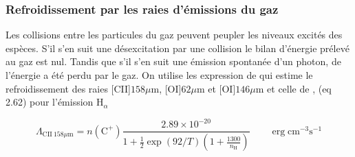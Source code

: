 






\subsubsection{Refroidissement par les raies d'émissions du gaz}

Les collisions entre les particules du gaz peuvent peupler les niveaux excités des espèces. S'il s'en suit une désexcitation par une collision le bilan d'énergie prélevé au gaz est nul. Tandis que s'il s'en suit une émission spontanée d'un photon, de l'énergie a été perdu par le gaz. On utilise les expression de \cite{Rollig2005} qui estime le refroidissement des raies [CII]$158 \mu \mathrm{m}$, [OI]$62 \mu \mathrm{m}$ et [OI]$146 \mu \mathrm{m}$ et celle de \cite{tielens2005}, (eq 2.62) pour l'émission $\mathrm{H}_\alpha$

\begin{equation}
    \Lambda_{\mathrm{CII}\ 158   \mu \mathrm{m}}= n(\mathrm{C}^+) \frac{2.89 \times 10^{-20}}{1+\frac{1}{2} \exp (92 / T)\left(1+\frac{1300}{n_\mathrm{H}}\right)} \qquad \operatorname{erg} \mathrm{cm}^{-3} \mathrm{s}^{-1}
\end{equation}

